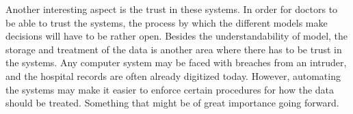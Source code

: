 Another interesting aspect is the trust in these systems.
In order for doctors to be able to trust the systems, the process by which the different models make decisions will have to be rather open.
Besides the understandability of model, the storage and treatment of the data is another area where there has to be trust in the systems.
Any computer system may be faced with breaches from an intruder, and the hospital records are often already digitized today.
However, automating the systems may make it easier to enforce certain procedures for how the data should be treated.
Something that might be of great importance going forward.